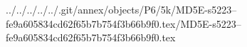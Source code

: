 ../../../../../.git/annex/objects/P6/5k/MD5E-s5223--fe9a605834cd62f65b7b754f3b66b9f0.tex/MD5E-s5223--fe9a605834cd62f65b7b754f3b66b9f0.tex